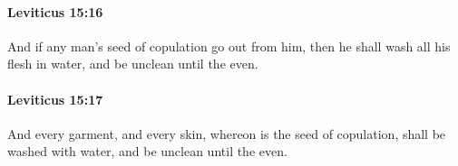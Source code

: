 		\paragraph{Leviticus 15:16} %
			\label{LEVITICUS-15-16}

			And if any man’s seed of copulation go out from him, then he shall wash all his flesh in water, and be unclean until the even.


		\paragraph{Leviticus 15:17} %
			\label{LEVITICUS-15-17}

			And every garment, and every skin, whereon is the seed of copulation, shall be washed with water, and be unclean until the even.


